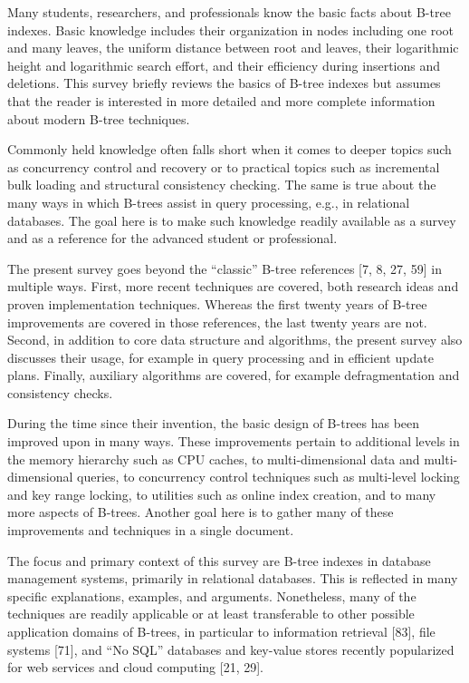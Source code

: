Many students, researchers, and professionals know the basic facts about
B-tree indexes. Basic knowledge includes their organization in nodes
including one root and many leaves, the uniform distance between root
and leaves, their logarithmic height and logarithmic search effort, and
their efficiency during insertions and deletions. This survey briefly
reviews the basics of B-tree indexes but assumes that the reader is
interested in more detailed and more complete information about modern
B-tree techniques.

Commonly held knowledge often falls short when it comes to deeper topics
such as concurrency control and recovery or to practical topics such as
incremental bulk loading and structural consistency checking. The same
is true about the many ways in which B-trees assist in query processing,
e.g., in relational databases. The goal here is to make such knowledge
readily available as a survey and as a reference for the advanced
student or professional.

The present survey goes beyond the ``classic'' B-tree references {[}7,
8, 27, 59{]} in multiple ways. First, more recent techniques are
covered, both research ideas and proven implementation techniques.
Whereas the first twenty years of B-tree improvements are covered in
those references, the last twenty years are not. Second, in addition to
core data structure and algorithms, the present survey also discusses
their usage, for example in query processing and in efficient update
plans. Finally, auxiliary algorithms are covered, for example
defragmentation and consistency checks.

During the time since their invention, the basic design of B-trees has
been improved upon in many ways. These improvements pertain to
additional levels in the memory hierarchy such as CPU caches, to
multi-dimensional data and multi-dimensional queries, to concurrency
control techniques such as multi-level locking and key range locking, to
utilities such as online index creation, and to many more aspects of
B-trees. Another goal here is to gather many of these improvements and
techniques in a single document.

The focus and primary context of this survey are B-tree indexes in
database management systems, primarily in relational databases. This is
reflected in many specific explanations, examples, and arguments.
Nonetheless, many of the techniques are readily applicable or at least
transferable to other possible application domains of B-trees, in
particular to information retrieval {[}83{]}, file systems {[}71{]}, and
``No SQL'' databases and key-value stores recently popularized for web
services and cloud computing {[}21, 29{]}.

